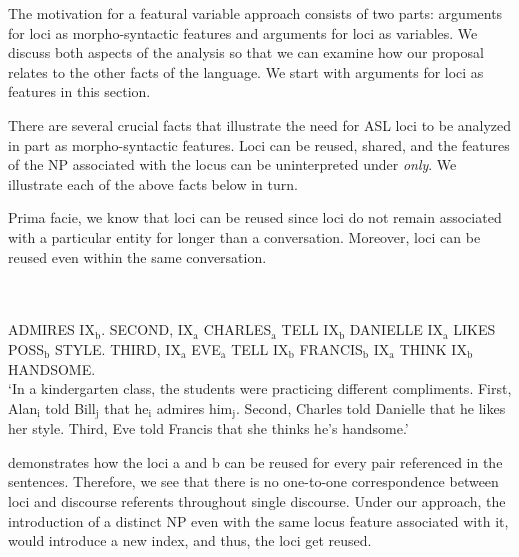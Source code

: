 \documentclass[output=paper,
modfonts
]{langscibook}
\begin{document}
The motivation for a featural variable approach consists of two parts: arguments for loci as morpho-syntactic features and arguments for loci as variables. We discuss both aspects of the analysis so that we can examine how our proposal relates to the other facts of the language. We start with arguments for loci as features in this section. 

There are several crucial facts that illustrate the need for ASL loci to be analyzed in part as morpho-syntactic features. Loci can be reused, shared, and the features of the NP associated with the locus can be uninterpreted under \textit{only}. We illustrate each of the above facts below in turn. 

Prima facie, we know that loci can be reused since loci do not remain associated with a particular entity for longer than a conversation. Moreover, loci can be reused even within the same conversation.

\begin{exe} 
	\ex \label{ex:irani:68}  \\  \\ ADMIRES IX$_\text{b}$. SECOND, IX$_\text{a}$ CHARLES$_\text{a}$ TELL IX$_\text{b}$ DANIELLE IX$_\text{a}$ LIKES POSS$_\text{b}$ STYLE. THIRD, IX$_\text{a}$ EVE$_\text{a}$ TELL IX$_\text{b}$ FRANCIS$_\text{b}$ IX$_\text{a}$ THINK IX$_\text{b}$ HANDSOME.\\
	`In a kindergarten class, the students were practicing different compliments. First, Alan$_\text{i}$ told Bill$_\text{j}$ that he$_\text{i}$ admires him$_\text{j}$. Second, Charles told Danielle that he likes her style. Third, Eve told Francis that she thinks he's handsome.' \citep[adapted from][462]{Kuhn2015}
\end{exe} 

 demonstrates how the loci a and b can be reused for every pair referenced in the sentences. Therefore, we see that there is no one-to-one correspondence between loci and discourse referents throughout  single discourse. Under our approach, the introduction of a distinct NP even with the same locus feature associated with it, would introduce a new index, and thus, the loci get reused. 
\end{document}
